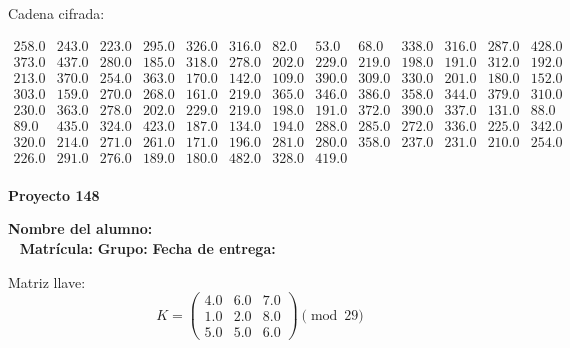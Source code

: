 \documentclass[12pt]{article}
\begin{document}
Cadena cifrada:
\begin{center}
$\begin{array}{lllllllllllll}
258.0 & 243.0 & 223.0 & 295.0 & 326.0 & 316.0 & 82.0 & 53.0 & 68.0 & 338.0 & 316.0 & 287.0 & 428.0\\
373.0 & 437.0 & 280.0 & 185.0 & 318.0 & 278.0 & 202.0 & 229.0 & 219.0 & 198.0 & 191.0 & 312.0 & 192.0\\
213.0 & 370.0 & 254.0 & 363.0 & 170.0 & 142.0 & 109.0 & 390.0 & 309.0 & 330.0 & 201.0 & 180.0 & 152.0\\
303.0 & 159.0 & 270.0 & 268.0 & 161.0 & 219.0 & 365.0 & 346.0 & 386.0 & 358.0 & 344.0 & 379.0 & 310.0\\
230.0 & 363.0 & 278.0 & 202.0 & 229.0 & 219.0 & 198.0 & 191.0 & 372.0 & 390.0 & 337.0 & 131.0 & 88.0\\
89.0 & 435.0 & 324.0 & 423.0 & 187.0 & 134.0 & 194.0 & 288.0 & 285.0 & 272.0 & 336.0 & 225.0 & 342.0\\
320.0 & 214.0 & 271.0 & 261.0 & 171.0 & 196.0 & 281.0 & 280.0 & 358.0 & 237.0 & 231.0 & 210.0 & 254.0\\
226.0 & 291.0 & 276.0 & 189.0 & 180.0 & 482.0 & 328.0 & 419.0\\
\end{array}$
\end{center}

\newpage


\textbf{Proyecto 148}

\textbf{Nombre del alumno:} \underline{\hspace{13cm}}\\\
\vspace{1cm}
\textbf{Matrícula:} \underline{\hspace{4cm}} \hspace{1cm}
\textbf{Grupo:} \underline{\hspace{2cm}}
\textbf{Fecha de entrega:} \underline{\hspace{2cm}}

\medskip

Matriz llave:
\[
K = \begin{pmatrix}
4.0 & 6.0 & 7.0\\
1.0 & 2.0 & 8.0\\
5.0 & 5.0 & 6.0
\end{pmatrix} \pmod{29}
\]
\end{document}
